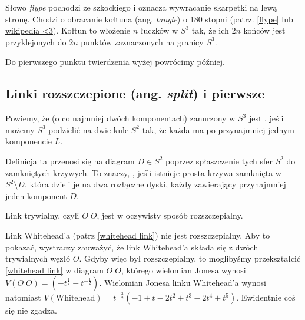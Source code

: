 \documentclass{article}
\begin{document}
Słowo \emph{flype} pochodzi ze szkockiego i oznacza wywracanie skarpetki na lewą stronę. Chodzi o obracanie kołtuna (ang. \emph{tangle}) o 180 stopni (patrz. \cref{flype} lub \href{https://en.wikipedia.org/wiki/Flype}{wikipedia <3}). Kołtun to włożenie $n$ łuczków w $S^3$ tak, że ich $2n$ końców jest przyklejonych do $2n$ punktów zaznaczonych na granicy $S^3$.

Do pierwszego punktu twierdzenia wyżej powrócimy później. %

\subsection{Linki rozszczepione (ang. \emph{split}) i pierwsze}

\begin{deff}
  Powiemy, że  (o co najmniej dwóch komponentach) zanurzony w $S^3$ jest , jeśli możemy $S^3$ podzielić na dwie kule $S^2$ tak, że każda ma po przynajmniej jednym komponencie $L$. 

  Definicja ta przenosi się na diagram $D\in S^2$ poprzez spłaszczenie tych sfer $S^2$ do zamkniętych krzywych. To znaczy, , jeśli istnieje prosta krzywa zamknięta w $S^2\setminus D$, która dzieli je na dwa rozłączne dyski, każdy zawierający przynajmniej jeden komponent $D$.
\end{deff}

Link trywialny, czyli $O\;O$, jest w oczywisty sposób rozszczepialny. 

Link Whitehead'a (patrz \cref{whitehead link}) nie jest rozszczepialny. Aby to pokazać, wystraczy zauważyć, że link Whitehead'a składa się z dwóch trywialnych węzłó $O$. Gdyby więc był rozszczepialny, to moglibyśmy przekształcić \cref{whitehead link} w diagram $O\;O$, którego wielomian Jonesa wynosi $V(O\;O)=(-t^{\frac{1}{2}}-t^{-\frac{1}{2}})$. Wielomian Jonesa linku Whitehead'a wynosi natomiast $V(\text{Whitehead})=t^{-\frac{3}{2}}(-1+t-2t^2+t^3-2t^4+t^5)$. Ewidentnie coś się nie zgadza.
\end{document}
